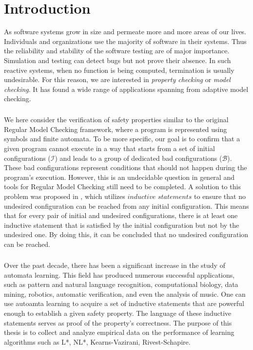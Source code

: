 
\chapter{Introduction}\label{chapter:introduction}
As software systems grow in size and permeate more and more areas of our lives.
Individuals and organizations use the majority of software in their systems. Thus the 
reliability and stability of the software testing are of major importance. Simulation 
and testing can detect bugs but not prove their absence. In such reactive 
systems, when no function is being computed, termination is usually undesirable. For 
this reason, we are interested in \textit{property checking} or \textit{model checking}. 
It has found a wide range of applications spanning from adaptive model checking.
\paragraph*{}
We here consider the verification of safety properties similar to the original 
Regular Model Checking framework, where a program is represented using symbols 
and finite automata.
To be more specific, our goal is to confirm that a given program cannot execute 
in a way that starts from a set of initial configurations ($\mathcal{I}$) and leads to a group 
of dedicated bad configurations ($\mathcal{B}$). These bad configurations represent conditions 
that should not happen during the program's execution. However, this is an 
undecidable question in general and tools for Regular Model Checking 
still need to be completed.
A solution to this problem was proposed in \cite*{clarke2009model}, which utilizes 
$\textit{inductive statements}$ to ensure that no undesired configuration can be reached 
from any initial configuration. This means that for every pair of initial 
and undesired configurations, there is at least one inductive statement that 
is satisfied by the initial configuration but not by the undesired one. 
By doing this, it can be concluded that no undesired configuration can be reached.
\paragraph*{}
Over the past decade, there has been a significant increase in the study of automata learning.
This field has produced numerous successful applications, such as pattern and natural language recognition, 
computational biology, data mining, robotics, automatic verification, and even the analysis of music.
One can use autoamta learning to acquire a set of inductive statements that 
are powerful enough to establish a given safety property. The language of these
inductive statements serves as proof of the property's correctness.
The purpose of this thesis is to collect and analyze empirical data on 
the performance of learning algorithms such as L*, NL*, Kearns-Vazirani, Rivest-Schapire.


